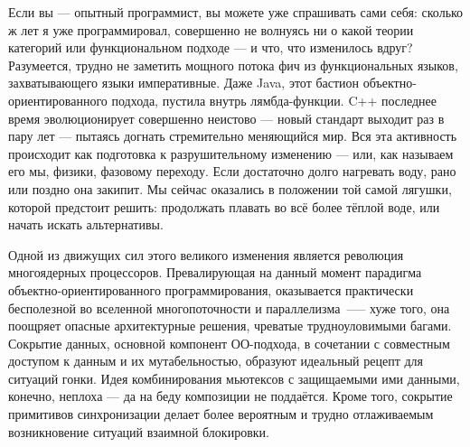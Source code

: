 Если вы — опытный программист, вы можете уже спрашивать сами себя: сколько ж лет я уже программировал,
совершенно не волнуясь ни о какой теории категорий или функциональном подходе — и что, что изменилось вдруг?
Разумеется, трудно не заметить мощного потока фич из функциональных языков, захватывающего языки императивные.
Даже Java, этот бастион объектно-ориентированного подхода, пустила внутрь лямбда-функции. C++ последнее время
эволюционирует совершенно неистово --- новый стандарт выходит раз в пару лет --- пытаясь догнать стремительно
меняющийся мир. Вся эта активность происходит как подготовка к разрушительному изменению --- или, как называем его мы,
физики, фазовому переходу. Если достаточно долго нагревать воду, рано или поздно она закипит. Мы сейчас оказались в
положении той самой лягушки, которой предстоит решить: продолжать плавать во всё более тёплой воде, или начать искать альтернативы.

\begin{figure}
\centering
{}
\end{figure}

Одной из движущих сил этого великого изменения является революция многоядерных процессоров.
Превалирующая на данный момент парадигма объектно-ориентированного программирования, оказывается
практически бесполезной во вселенной многопоточности и параллелизма —-- хуже того, она поощряет опасные
архитектурные решения, чреватые трудноуловимыми багами. Сокрытие данных, основной компонент ОО-подхода,
в сочетании с совместным доступом к данным и их мутабельностью, образуют идеальный рецепт для ситуаций гонки.
Идея комбинирования мьютексов с защищаемыми ими данными, конечно, неплоха — да на беду композиции не поддаётся.
Кроме того, сокрытие примитивов синхронизации делает более вероятным и трудно отлаживаемым
возникновение ситуаций взаимной блокировки.

